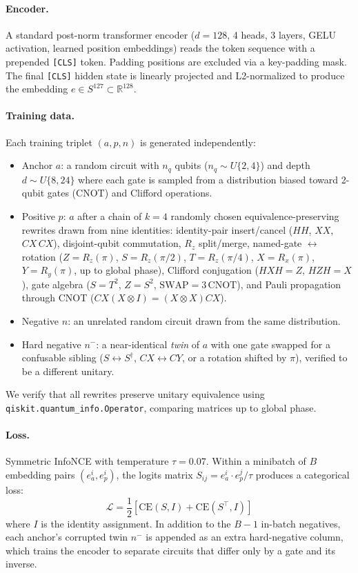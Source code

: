 \documentclass[11pt]{article}
\begin{document}
\paragraph{Encoder.} A standard post-norm transformer encoder ($d = 128$, 4 heads, 3 layers, GELU activation, learned position embeddings) reads the token sequence with a prepended \texttt{[CLS]} token. Padding positions are excluded via a key-padding mask. The final \texttt{[CLS]} hidden state is linearly projected and L2-normalized to produce the embedding $e \in S^{127} \subset \mathbb{R}^{128}$.

\paragraph{Training data.} Each training triplet $(a, p, n)$ is generated independently:
\begin{itemize}[topsep=2pt,itemsep=2pt]
    \item Anchor $a$: a random circuit with $n_q$ qubits ($n_q \sim U\{2,4\}$) and depth $d \sim U\{8,24\}$ where each gate is sampled from a distribution biased toward 2-qubit gates (CNOT) and Clifford operations.
    \item Positive $p$: $a$ after a chain of $k=4$ randomly chosen equivalence-preserving rewrites drawn from nine identities: identity-pair insert/cancel ($HH$, $XX$, $CX\,CX$), disjoint-qubit commutation, $R_z$ split/merge, named-gate $\leftrightarrow$ rotation ($Z = R_z(\pi)$, $S = R_z(\pi/2)$, $T = R_z(\pi/4)$, $X = R_x(\pi)$, $Y = R_y(\pi)$, up to global phase), Clifford conjugation ($HXH = Z$, $HZH = X$), gate algebra ($S = T^2$, $Z = S^2$, $\mathrm{SWAP} = 3\,\mathrm{CNOT}$), and Pauli propagation through CNOT ($CX(X \otimes I) = (X \otimes X)CX$).
    \item Negative $n$: an unrelated random circuit drawn from the same distribution.
    \item Hard negative $n^-$: a near-identical \emph{twin} of $a$ with one gate swapped for a confusable sibling ($S \leftrightarrow S^\dagger$, $CX \leftrightarrow CY$, or a rotation shifted by $\pi$), verified to be a different unitary.
\end{itemize}
We verify that all rewrites preserve unitary equivalence using \texttt{qiskit.quantum\_info.Operator}, comparing matrices up to global phase.

\paragraph{Loss.} Symmetric InfoNCE \cite{infonce, clip} with temperature $\tau = 0.07$. Within a minibatch of $B$ embedding pairs $(e_a^i, e_p^i)$, the logits matrix $S_{ij} = e_a^i \cdot e_p^j / \tau$ produces a categorical loss:
$$\mathcal{L} = \frac{1}{2}\left[\text{CE}(S, I) + \text{CE}(S^\top, I)\right]$$
where $I$ is the identity assignment. In addition to the $B-1$ in-batch negatives, each anchor's corrupted twin $n^-$ is appended as an extra hard-negative column, which trains the encoder to separate circuits that differ only by a gate and its inverse.
\end{document}
